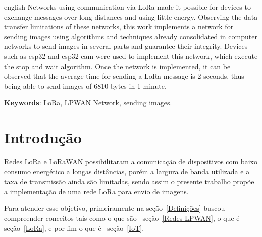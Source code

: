 \documentclass[
article,			%
12pt,				%
oneside,			%
a4paper,			%
english,			%
brazil,				%
sumario=tradicional
]{abntex2}
\begin{document}
\renewcommand{\resumoname}{Abstract}
\begin{resumoumacoluna}
  \begin{otherlanguage*}{english}
      Networks using communication via LoRa made it possible for devices to exchange messages over long distances and using little energy. Observing the data transfer limitations of these networks, this work implements a network for sending images using algorithms and techniques already consolidated in computer networks to send images in several parts and guarantee their integrity. Devices such as esp32 and esp32-cam were used to implement this network, which execute the stop and wait algorithm. Once the network is implemented, it can be observed that the average time for sending a LoRa message is 2 seconds, thus being able to send images of 6810 bytes in 1 minute.
    \vspace{\onelineskip}
    \noindent

    \textbf{Keywords}: LoRa, LPWAN Network, sending images.
  \end{otherlanguage*}  
\end{resumoumacoluna}



\cleardoublepage



\textual

\section{Introdução}\label{Introdução}
Redes LoRa e LoRaWAN possibilitaram a comunicação de dispositivos com baixo consumo energético a longas distâncias\cite{bor2016lora}, porém a largura de banda utilizada e a taxa de transmissão ainda são limitadas, sendo assim o presente trabalho propõe a implementação de uma rede LoRa para envio de imagens.

Para atender esse objetivo, primeiramente na seção~\ref{Definições} buscou compreender conceitos tais como o que são~ seção~\ref{Redes LPWAN}, o que é~ seção~\ref{LoRa}, e por fim o que é~ seção~\ref{IoT}.
\end{document}
